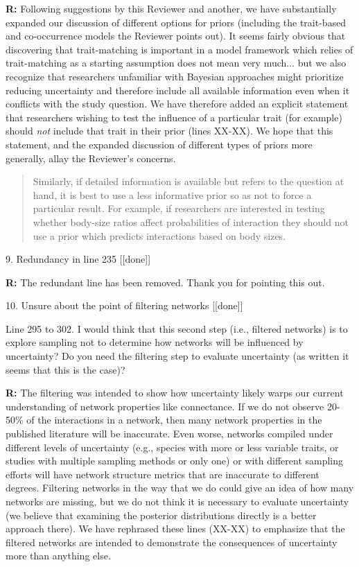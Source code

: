 \documentclass[12pt]{letter}
\newenvironment{refquote}{\bigskip \begin{it}}{\end{it}\smallskip}
\begin{document}
\begin{itemize}
		\textbf{R:} Following suggestions by this Reviewer and another, we have substantially expanded our discussion of different options for priors (including the trait-based and co-occurrence models the Reviewer points out). It seems fairly obvious that discovering that trait-matching is important in a model framework which relies of trait-matching as a starting assumption does not mean very much... but we also recognize that researchers unfamiliar with Bayesian approaches might prioritize reducing uncertainty and therefore include all available information even when it conflicts with the study question. We have therefore added an explicit statement that researchers wishing to test the influence of a particular trait (for example) should \emph{not} include that trait in their prior (lines XX-XX). We hope that this statement, and the expanded discussion of different types of priors more generally, allay the Reviewer's concerns. 

		\begin{quotation}
			Similarly, if detailed information is available but refers to the question at hand, it is best to use a less informative prior so as not to force a particular result. For example, if researchers are interested in testing whether body-size ratios affect probabilities of interaction they should not use a prior which predicts interactions based on body sizes.
		\end{quotation}


	9. Redundancy in line 235 [[done]]

		\textbf{R:} The redundant line has been removed. Thank you for pointing this out.


	10. Unsure about the point of filtering networks [[done]]

		\begin{refquote}
		Line 295 to 302.  I would think that this second step (i.e., filtered networks) is to explore sampling not to determine how networks will be influenced by uncertainty?  Do you need the filtering step to evaluate uncertainty (as written it seems that this is the case)?
		\end{refquote}

		\textbf{R:} The filtering was intended to show how uncertainty likely warps our current understanding of network properties like connectance. If we do not observe 20-50\% of the interactions in a network, then many network properties in the published literature will be inaccurate. Even worse, networks compiled under different levels of uncertainty (e.g., species with more or less variable traits, or studies with multiple sampling methods or only one) or with different sampling efforts will have network structure metrics that are inaccurate to different degrees. Filtering networks in the way that we do could give an idea of how many networks are missing, but we do not think it is necessary to evaluate uncertainty (we believe that examining the posterior distributions directly is a better approach there). We have rephrased these lines (XX-XX) to emphasize that the filtered networks are intended to demonstrate the consequences of uncertainty more than anything else.


\end{itemize}
\end{document}
